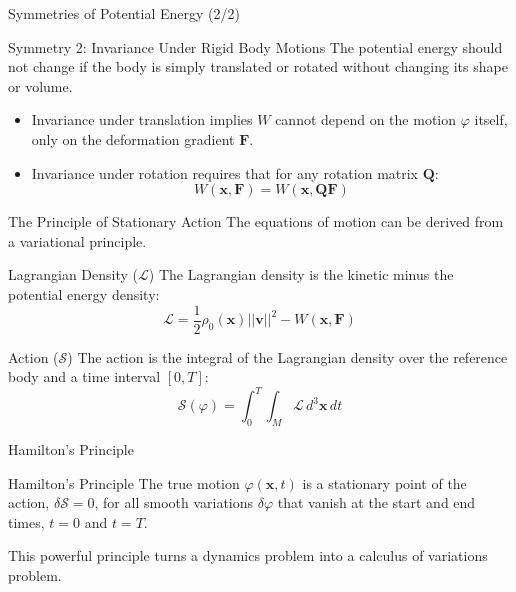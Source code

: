 \documentclass{beamer}
\begin{document}
\begin{frame}{Symmetries of Potential Energy (2/2)}
    \begin{block}{Symmetry 2: Invariance Under Rigid Body Motions}
        The potential energy should not change if the body is simply translated or rotated without changing its shape or volume.
        \pause
        \begin{itemize}
            \item Invariance under translation implies $W$ cannot depend on the motion $\varphi$ itself, only on the deformation gradient $\mathbf{F}$.
            \item Invariance under rotation requires that for any rotation matrix $\mathbf{Q}$:
            $$ W(\mathbf{x}, \mathbf{F}) = W(\mathbf{x}, \mathbf{QF}) $$
        \end{itemize}
    \end{block}
\end{frame}


\begin{frame}{The Principle of Stationary Action}
    The equations of motion can be derived from a variational principle.

    \begin{block}{Lagrangian Density ($\mathcal{L}$)}
        The Lagrangian density is the kinetic minus the potential energy density:
        $$ \mathcal{L} = \frac{1}{2} \rho_0(\mathbf{x}) ||\mathbf{v}||^2 - W(\mathbf{x}, \mathbf{F}) $$
    \end{block}
    \pause
    
    \begin{block}{Action ($\mathcal{S}$)}
        The action is the integral of the Lagrangian density over the reference body and a time interval $[0, T]$:
        $$ \mathcal{S}(\varphi) = \int_0^T \int_M \mathcal{L} \, d^3\mathbf{x} \, dt $$
    \end{block}
\end{frame}

\begin{frame}{Hamilton's Principle}
    \begin{alertblock}{Hamilton's Principle}
        The true motion $\varphi(\mathbf{x}, t)$ is a stationary point of the action, $\delta\mathcal{S} = 0$, for all smooth variations $\delta\varphi$ that vanish at the start and end times, $t=0$ and $t=T$.
    \end{alertblock}
    \begin{center}
    \end{center}
    This powerful principle turns a dynamics problem into a calculus of variations problem.
\end{frame}
\end{document}

